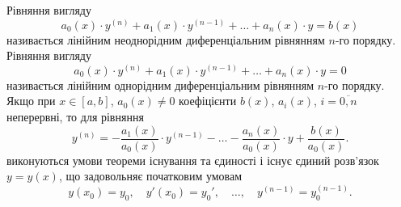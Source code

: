 Рівняння вигляду
\begin{equation*}
	a_0(x) \cdot y^{(n)} + a_1(x) \cdot y^{(n - 1)} + \ldots + a_n(x) \cdot y = b(x)
\end{equation*} 
називається лінійним неоднорідним диференціальним рівнянням $n$-го порядку. \\

Рівняння вигляду
\begin{equation*}
	a_0(x) \cdot y^{(n)} + a_1(x) \cdot y^{(n - 1)} + \ldots + a_n(x) \cdot y = 0
\end{equation*} 
називається лінійним однорідним диференціальним рівнянням $n$-го порядку. \\

Якщо при $x \in [a, b]$, $a_0(x) \ne 0$ коефіцієнти $b(x)$, $a_i(x)$, $i=\overline{0,n}$ неперервні, то для рівняння
\begin{equation*}
	y^{(n)} = - \frac{a_1(x)}{a_0(x)} \cdot y^{(n - 1)} - \ldots - \frac{a_n(x)}{a_0(x)} \cdot y + \frac{b(x)}{a_0(x)}.
\end{equation*}
виконуються умови теореми існування та єдиності і існує єдиний роз\-в'яз\-ок $y = y(x)$, що задовольняє початковим умовам
\begin{equation*}
	y(x_0) = y_0, \quad y'(x_0) = y_0', \quad \ldots, \quad y^{(n - 1)} = y_0^{(n - 1)}.
\end{equation*}
